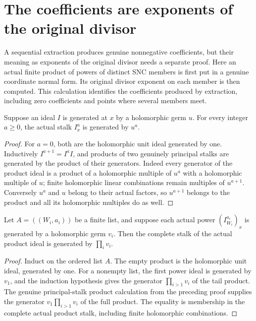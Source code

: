 \section{The coefficients are exponents of the original divisor}
\label{sec:hironaka-snc-component-coefficients}

A sequential extraction produces genuine nonnegative coefficients, but
their meaning as exponents of the original divisor needs a separate
proof.  Here an actual finite product of powers of distinct SNC members
is first put in a genuine coordinate normal form.  Its original
divisor exponent on each member is then computed.  This calculation
identifies the coefficients produced by extraction, including zero
coefficients and points where several members meet.

\begin{lemma}
\label{hir:component-power-principal-stalk}
\leanok
Suppose an ideal $I$ is generated at $x$ by a holomorphic germ $u$.
For every integer $a\ge0$, the actual stalk $I_x^a$ is generated by $u^a$.
\end{lemma}
\begin{proof}
For $a=0$, both are the holomorphic unit ideal generated by one.
Inductively $I^{a+1}=I^a I$, and products of two genuinely principal
stalks are generated by the product of their generators.
Indeed every generator of the product ideal is a product of a
holomorphic multiple of $u^a$ with a holomorphic multiple of $u$;
finite holomorphic linear combinations remain multiples of $u^{a+1}$.
Conversely $u^a$ and $u$ belong to their actual factors, so $u^{a+1}$
belongs to the product and all its holomorphic multiples do as well.
\end{proof}

\begin{lemma}
\label{hir:component-product-principal-stalk}
\leanok
Let $A=((W_i,a_i))$ be a finite list, and suppose each actual power
$(I_{W_i}^{a_i})_x$ is generated by a holomorphic germ $v_i$.
Then the complete stalk of the actual product ideal is generated by
$\prod_i v_i$.
\end{lemma}
\begin{proof}
Induct on the ordered list $A$.  The empty product is the holomorphic
unit ideal, generated by one.  For a nonempty list, the first power
ideal is generated by $v_1$, and the induction hypothesis gives the
generator $\prod_{i>1}v_i$ of the tail product.
The genuine principal-stalk product calculation from the preceding
proof supplies the generator $v_1\prod_{i>1}v_i$ of the full product.
The equality is membership in the complete actual product stalk,
including finite holomorphic combinations.
\end{proof}

